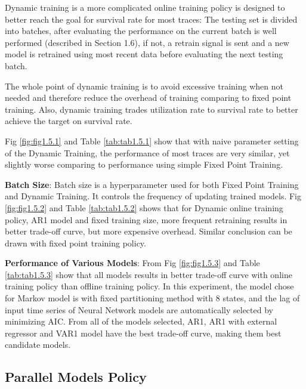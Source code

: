 \documentclass{article}
\begin{document}
\begin{flushleft}
Dynamic training is a more complicated online training policy is designed to better reach the goal for survival rate for most traces: The testing set is divided into batches, after evaluating the performance on the current batch is well performed (described in Section 1.6), if not, a retrain signal is sent and a new model is retrained using most recent data before evaluating the next testing batch. 

The whole point of dynamic training is to avoid excessive training when not needed and therefore reduce the overhead of training comparing to fixed point training. Also, dynamic training trades utilization rate to survival rate to better achieve the target on survival rate.

Fig \ref{fig:fig1.5.1} and Table \ref{tab:tab1.5.1} show that with naive parameter setting of the Dynamic Training, the performance of most traces are very similar, yet slightly worse comparing to performance using simple Fixed Point Training.
\end{flushleft}

\begin{flushleft}
\textbf{Batch Size}: Batch size is a hyperparameter used for both Fixed Point Training and Dynamic Training. It controls the frequency of updating trained models. Fig \ref{fig:fig1.5.2} and Table \ref{tab:tab1.5.2} shows that for Dynamic online training policy, AR1 model and fixed training size, more frequent retraining results in better trade-off curve, but more expensive overhead. Similar conclusion can be drawn with fixed point training policy.
\end{flushleft}

\begin{flushleft}
\textbf{Performance of Various Models}: From Fig \ref{fig:fig1.5.3} and Table \ref{tab:tab1.5.3} show that all models results in better trade-off curve with online training policy than offline training policy. In this experiment, the model chose for Markov model is with fixed partitioning method with $8$ states, and the lag of input time series of Neural Network models are automatically selected by minimizing AIC. From all of the models selected, AR1, AR1 with external regressor and VAR1 model have the best trade-off curve, making them best candidate models.
\end{flushleft}

\subsection{Parallel Models Policy}
\end{document}
